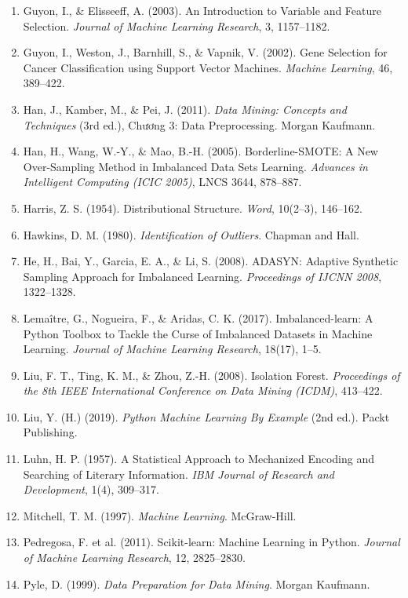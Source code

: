 \begin{enumerate}
    \item Guyon, I., \& Elisseeff, A. (2003). An Introduction to Variable and Feature Selection. \textit{Journal of Machine Learning Research}, 3, 1157--1182.
    \item Guyon, I., Weston, J., Barnhill, S., \& Vapnik, V. (2002). Gene Selection for Cancer Classification using Support Vector Machines. \textit{Machine Learning}, 46, 389--422.
    \item Han, J., Kamber, M., \& Pei, J. (2011). \textit{Data Mining: Concepts and Techniques} (3rd ed.), Chương 3: Data Preprocessing. Morgan Kaufmann.
    \item Han, H., Wang, W.-Y., \& Mao, B.-H. (2005). Borderline-SMOTE: A New Over-Sampling Method in Imbalanced Data Sets Learning. \textit{Advances in Intelligent Computing (ICIC 2005)}, LNCS 3644, 878--887.
    \item Harris, Z. S. (1954). Distributional Structure. \textit{Word}, 10(2--3), 146--162.
    \item Hawkins, D. M. (1980). \textit{Identification of Outliers}. Chapman and Hall.
    \item He, H., Bai, Y., Garcia, E. A., \& Li, S. (2008). ADASYN: Adaptive Synthetic Sampling Approach for Imbalanced Learning. \textit{Proceedings of IJCNN 2008}, 1322--1328.
    \item Lemaître, G., Nogueira, F., \& Aridas, C. K. (2017). Imbalanced-learn: A Python Toolbox to Tackle the Curse of Imbalanced Datasets in Machine Learning. \textit{Journal of Machine Learning Research}, 18(17), 1--5.
    \item Liu, F. T., Ting, K. M., \& Zhou, Z.-H. (2008). Isolation Forest. \textit{Proceedings of the 8th IEEE International Conference on Data Mining (ICDM)}, 413--422.
    \item Liu, Y. (H.) (2019). \textit{Python Machine Learning By Example} (2nd ed.). Packt Publishing.
    \item Luhn, H. P. (1957). A Statistical Approach to Mechanized Encoding and Searching of Literary Information. \textit{IBM Journal of Research and Development}, 1(4), 309--317.
    \item Mitchell, T. M. (1997). \textit{Machine Learning}. McGraw-Hill.
    \item Pedregosa, F. et al. (2011). Scikit-learn: Machine Learning in Python. \textit{Journal of Machine Learning Research}, 12, 2825--2830.
    \item Pyle, D. (1999). \textit{Data Preparation for Data Mining}. Morgan Kaufmann.

\end{enumerate}
